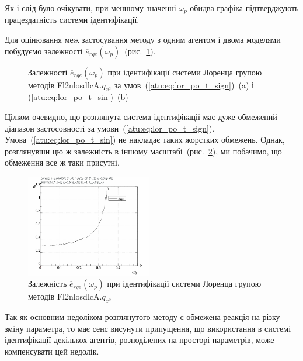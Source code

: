 Як і слід було очікувати, при меншому значенні
$\omega_p$ обидва графіка підтверджують працездатність системи
ідентифікації.

Для оцінювання меж застосування методу з одним агентом і двома
моделями побудуємо залежності
$\overline{e}_{rge}(\omega_p)$~(рис.~\ref{atu:f:lor_Fl2nlosdlcA_e_omega_p}).

\begin{figure}[htb!]
  \caption{Залежності $\overline{e}_{rge}(\omega_p)$ при ідентифікації системи Лоренца групою методів Fl2nlosdlcA.$q_{x^2}$ за умов~(\ref{atu:eq:lor_po_t_sign})~(a) і (\ref{atu:eq:lor_po_t_sin})~(b)}
  \label{atu:f:lor_Fl2nlosdlcA_e_omega_p}
\end{figure}

Цілком очевидно, що розглянута система ідентифікації
має дуже обмежений діапазон застосовності за
умови~(\ref{atu:eq:lor_po_t_sign}). Умова~(\ref{atu:eq:lor_po_t_sin}) не накладає таких
жорстких обмежень. Однак, розглянувши цю ж залежність в іншому
масштабі~(рис.~\ref{atu:f:lor_Fl2nlosdlcA_e_omega_p_wide}), ми побачимо, що обмеження
все ж таки присутні.

\begin{figure}[htb!]
  \begin{center}
    \includegraphics[width=0.49\textwidth]{p/cha/lor/Fl2nlosdlcA/Fl2nlosdlcA-p_omega_p_e_0_wide.png}
  \end{center}
  \caption{Залежність $\overline{e}_{rge}(\omega_p) $ при ідентифікації системи Лоренца групою методів Fl2nlosdlcA.$q_{x^2}$}
  \label{atu:f:lor_Fl2nlosdlcA_e_omega_p_wide}
\end{figure}

Так як основним недоліком розглянутого методу є обмежена
реакція на різку зміну параметра, то має сенс висунути
припущення, що використання в системі ідентифікації декількох
агентів, розподілених на просторі параметрів, може компенсувати
цей недолік.


